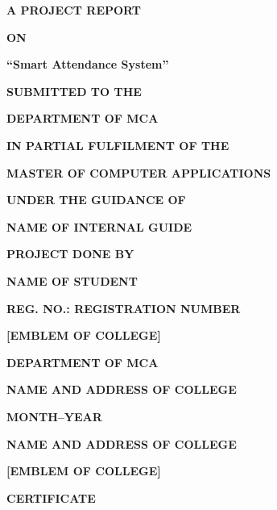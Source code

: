 \documentclass[12pt,a4paper]{report}
\newcommand{\ProjectTitleTitleCase}{Smart Attendance System}
\newcommand{\StudentName}{NAME OF STUDENT}
\newcommand{\RegisterNumber}{REGISTRATION NUMBER}
\newcommand{\GuideName}{NAME OF INTERNAL GUIDE}
\newcommand{\CollegeName}{NAME AND ADDRESS OF COLLEGE}
\newcommand{\DepartmentName}{DEPARTMENT OF MCA}
\newcommand{\SubmissionMonthYear}{MONTH--YEAR}
\newcommand{\frontmatterpage}{\clearpage\thispagestyle{empty}}
\begin{document}
\begin{titlepage}
\thispagestyle{empty}
\centering
\vspace*{0.25cm}
{\bfseries A PROJECT REPORT\par}
\vspace{0.35cm}
{\bfseries ON\par}
\vspace{0.55cm}
{\bfseries ``\ProjectTitleTitleCase''\par}
\vspace{0.4cm}
{\bfseries SUBMITTED TO THE\par}
\vspace{0.25cm}
{\bfseries \DepartmentName\par}
\vspace{0.25cm}
{\bfseries IN PARTIAL FULFILMENT OF THE\par}
\vspace{0.55cm}
{\bfseries MASTER OF COMPUTER APPLICATIONS\par}
\vspace{1.15cm}
{\bfseries UNDER THE GUIDANCE OF\par}
\vspace{0.25cm}
{\bfseries \GuideName\par}
\vspace{1.05cm}
{\bfseries PROJECT DONE BY\par}
\vspace{0.25cm}
{\bfseries \StudentName\par}
\vspace{0.25cm}
{\bfseries REG. NO.: \RegisterNumber\par}
\vspace{1.15cm}
{\bfseries [EMBLEM OF COLLEGE]\par}
\vspace{0.75cm}
{\bfseries \DepartmentName\par}
\vspace{0.45cm}
{\bfseries \CollegeName\par}
\vfill
{\bfseries \SubmissionMonthYear\par}
\end{titlepage}

\frontmatterpage
\begin{center}
\textbf{\CollegeName}

\vspace{1.1cm}
\textbf{[EMBLEM OF COLLEGE]}

\vspace{1.1cm}
\textbf{CERTIFICATE}
\end{center}
\end{document}
